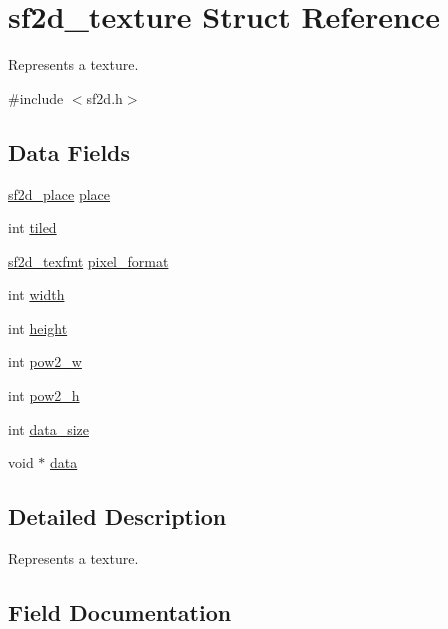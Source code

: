 \hypertarget{structsf2d__texture}{}\section{sf2d\+\_\+texture Struct Reference}
\label{structsf2d__texture}


Represents a texture.  




{\ttfamily \#include $<$sf2d.\+h$>$}

\subsection*{Data Fields}
\begin{DoxyCompactItemize}
\item 
\hyperlink{sf2d_8h_a07951fad547d423a4cf6521c2e5171ea}{sf2d\+\_\+place} \hyperlink{structsf2d__texture_ac30cfc2de337739d1a19858e4fdacaa4}{place}
\item 
int \hyperlink{structsf2d__texture_a4a66a4712612cc5e3f5cdff7d0e604ec}{tiled}
\item 
\hyperlink{sf2d_8h_a159c44ac8ef84cd08235063d4e220244}{sf2d\+\_\+texfmt} \hyperlink{structsf2d__texture_a1292c9a846b8593163bd3c1eaeb459c2}{pixel\+\_\+format}
\item 
int \hyperlink{structsf2d__texture_a312abd0ee8ab587825804132c136b253}{width}
\item 
int \hyperlink{structsf2d__texture_a055ccacd41038339dd1ded72747ccf8f}{height}
\item 
int \hyperlink{structsf2d__texture_aa1c5388828ad6d18ea37eb2e6ace7f48}{pow2\+\_\+w}
\item 
int \hyperlink{structsf2d__texture_a644c43b5fde6e12c8f1e3cb0280798e1}{pow2\+\_\+h}
\item 
int \hyperlink{structsf2d__texture_a99107fa90e683bab6456da738ff9d005}{data\+\_\+size}
\item 
void $\ast$ \hyperlink{structsf2d__texture_a46673c7ce439c63554a23e6ce83b254f}{data}
\end{DoxyCompactItemize}


\subsection{Detailed Description}
Represents a texture. 

\subsection{Field Documentation}
\hypertarget{structsf2d__texture_a46673c7ce439c63554a23e6ce83b254f}{}
